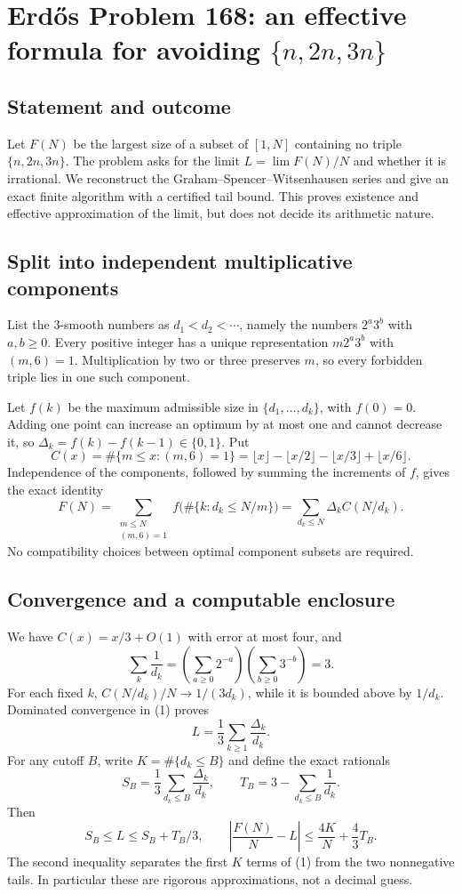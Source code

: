 \section*{Erd\H{o}s Problem 168: an effective formula for avoiding $\{n,2n,3n\}$}
\subsection*{Statement and outcome}
Let $F(N)$ be the largest size of a subset of $[1,N]$ containing no triple $\{n,2n,3n\}$. The problem asks for the limit $L=\lim F(N)/N$ and whether it is irrational.
We reconstruct the Graham--Spencer--Witsenhausen series and give an exact finite algorithm with a certified tail bound. This proves existence and effective approximation of the limit, but does not decide its arithmetic nature.

\subsection*{Split into independent multiplicative components}
List the $3$-smooth numbers as $d_1<d_2<\cdots$, namely the numbers $2^a3^b$ with $a,b\ge0$. Every positive integer has a unique representation $m2^a3^b$ with $(m,6)=1$. Multiplication by two or three preserves $m$, so every forbidden triple lies in one such component.

Let $f(k)$ be the maximum admissible size in $\{d_1,\ldots,d_k\}$, with $f(0)=0$. Adding one point can increase an optimum by at most one and cannot decrease it, so
$\Delta_k=f(k)-f(k-1)\in\{0,1\}$.
Put
\[
 C(x)=\#\{m\le x:(m,6)=1\}
 =\lfloor x\rfloor-\lfloor x/2\rfloor-\lfloor x/3\rfloor+\lfloor x/6\rfloor.
\]
Independence of the components, followed by summing the increments of $f$, gives the exact identity
\[
 F(N)=\sum_{\substack{m\le N\\(m,6)=1}}
 f\bigl(\#\{k:d_k\le N/m\}\bigr)
 =\sum_{d_k\le N}\Delta_k C(N/d_k).
 \tag{1}
\]
No compatibility choices between optimal component subsets are required.

\subsection*{Convergence and a computable enclosure}
We have $C(x)=x/3+O(1)$ with error at most four, and
\[
 \sum_k\frac1{d_k}
 =\left(\sum_{a\ge0}2^{-a}\right)
  \left(\sum_{b\ge0}3^{-b}\right)=3.
\]
For each fixed $k$, $C(N/d_k)/N\to1/(3d_k)$, while it is bounded above by $1/d_k$. Dominated convergence in (1) proves
\[
 L=\frac13\sum_{k\ge1}\frac{\Delta_k}{d_k}. \tag{2}
\]
For any cutoff $B$, write $K=\#\{d_k\le B\}$ and define the exact rationals
\[
 S_B=\frac13\sum_{d_k\le B}\frac{\Delta_k}{d_k},
 \qquad T_B=3-\sum_{d_k\le B}\frac1{d_k}.
\]
Then
\[
 S_B\le L\le S_B+T_B/3,\qquad
 \left|\frac{F(N)}N-L\right|
 \le \frac{4K}{N}+\frac43T_B.
 \tag{3}
\]
The second inequality separates the first $K$ terms of (1) from the two nonnegative tails. In particular these are rigorous approximations, not a decimal guess.

